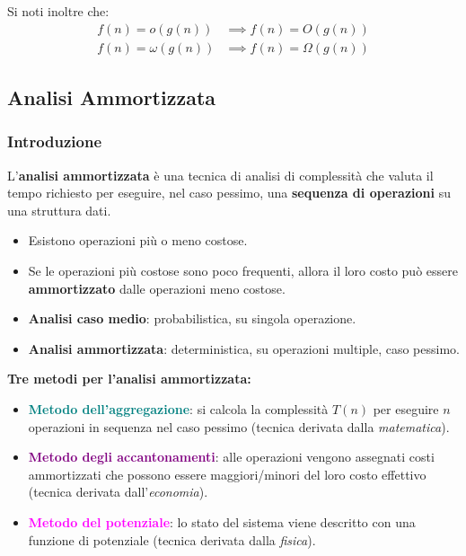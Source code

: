 \documentclass[12pt, a4paper]{article}
\begin{document}
Si noti inoltre che:
\begin{align*}
f(n) = o(g(n)) &\implies f(n) = O(g(n)) \\
f(n) = \omega(g(n)) &\implies f(n) = \Omega(g(n))
\end{align*}



\subsection{Analisi Ammortizzata}
\label{sec:analisi-ammortizzata}

\subsubsection{Introduzione}

\begin{tcolorbox}[colback=lightergray!10, colframe=tocsec, title=\textbf{Definizione: Analisi Ammortizzata}]
\label{def:analisi-ammortizzata}
L'\textbf{analisi ammortizzata} è una tecnica di analisi di complessità che valuta il tempo richiesto per eseguire, nel caso pessimo, una \textbf{sequenza di operazioni} su una struttura dati.
\begin{itemize}
    \item Esistono operazioni più o meno costose.
    \item Se le operazioni più costose sono poco frequenti, allora il loro costo può essere \textbf{ammortizzato} dalle operazioni meno costose.
\end{itemize}
\end{tcolorbox}

\begin{tcolorbox}[colback=lightergray!5, colframe=tocsubsec, title=\textbf{Importante Differenza}]
\begin{itemize}
    \item \textbf{Analisi caso medio}: probabilistica, su singola operazione.
    \item \textbf{Analisi ammortizzata}: deterministica, su operazioni multiple, caso pessimo.
\end{itemize}
\end{tcolorbox}

\textbf{Tre metodi per l'analisi ammortizzata:}
\begin{itemize}
    \item \textcolor{teal}{\textbf{Metodo dell'aggregazione}}: si calcola la complessità $T(n)$ per eseguire $n$ operazioni in sequenza nel caso pessimo (tecnica derivata dalla \textit{matematica}).
    \item \textcolor{purple}{\textbf{Metodo degli accantonamenti}}: alle operazioni vengono assegnati costi ammortizzati che possono essere maggiori/minori del loro costo effettivo (tecnica derivata dall'\textit{economia}).
    \item \textcolor{magenta}{\textbf{Metodo del potenziale}}: lo stato del sistema viene descritto con una funzione di potenziale (tecnica derivata dalla \textit{fisica}).
\end{itemize}
\end{document}

